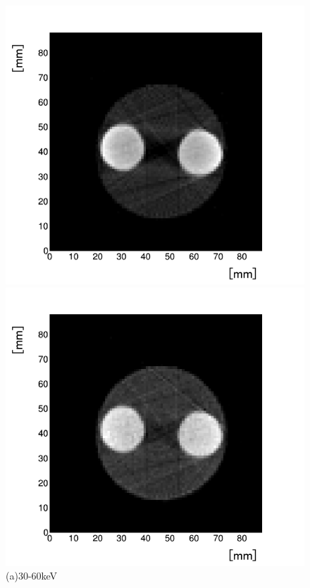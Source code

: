 \begin{figure}[H]
 \begin{minipage}{0.5\hsize}
  \begin{center}
   \includegraphics[bb=0.000000 0.000000 314.853972 293.735718,width=1.0\hsize]{image2/chapter5/BH_30-60.png}
  \end{center}  
\vspace{-1cm}
\caption*{(a)30-60keV}
 \end{minipage}
 \begin{minipage}{0.5\hsize}
  \begin{center}
   \includegraphics[bb=0.000000 0.000000 314.853972 293.735718,width=1.0\hsize]{image2/chapter5/BH_60-90.png}

\end{center}
\end{minipage}
\end{figure}
